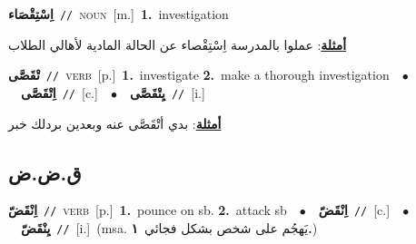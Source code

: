 \documentclass[10pt,a4paper,twoside]{article} %
\begin{document}
\begin{multicols}{2}
{\setlength\topsep{0pt}\textbf{\foreignlanguage{arabic}{اِسْتِقْصَاء}}\ {\color{gray}\texttt{//}\color{black}}\ \textsc{noun}\ [m.]\ \textbf{1.}~investigation\  \begin{flushright}\color{gray}\foreignlanguage{arabic}{\textbf{\underline{\foreignlanguage{arabic}{أمثلة}}}: عملوا بالمدرسة اِسْتِقْصاء عن الحالة المادية لأهالي الطلاب}\end{flushright}\color{black}} \vspace{2mm}

{\setlength\topsep{0pt}\textbf{\foreignlanguage{arabic}{تْقَصَّى}}\ {\color{gray}\texttt{//}\color{black}}\ \textsc{verb}\ [p.]\ \textbf{1.}~investigate  \textbf{2.}~make a thorough investigation\ \ $\bullet$\ \ \setlength\topsep{0pt}\textbf{\foreignlanguage{arabic}{اِتْقَصَّى}}\ {\color{gray}\texttt{//}\color{black}}\ [c.]\ \ $\bullet$\ \ \setlength\topsep{0pt}\textbf{\foreignlanguage{arabic}{يِتْقَصَّى}}\ {\color{gray}\texttt{//}\color{black}}\ [i.]\  \begin{flushright}\color{gray}\foreignlanguage{arabic}{\textbf{\underline{\foreignlanguage{arabic}{أمثلة}}}: بدي أتْقَصَّى عنه وبعدين بردلك خبر}\end{flushright}\color{black}} \vspace{2mm}

\vspace{-3mm}
\subsection*{\color{blue}\foreignlanguage{arabic}{ق.ض.ض}\color{blue}{}} 

{\setlength\topsep{0pt}\textbf{\foreignlanguage{arabic}{اِنْقَضّ}}\ {\color{gray}\texttt{//}\color{black}}\ \textsc{verb}\ [p.]\ \textbf{1.}~pounce on sb.  \textbf{2.}~attack sb\ \ $\bullet$\ \ \setlength\topsep{0pt}\textbf{\foreignlanguage{arabic}{اِنْقَضّ}}\ {\color{gray}\texttt{//}\color{black}}\ [c.]\ \ $\bullet$\ \ \setlength\topsep{0pt}\textbf{\foreignlanguage{arabic}{يِنْقَضّ}}\ {\color{gray}\texttt{//}\color{black}}\ [i.]\ \color{gray}(msa. \foreignlanguage{arabic}{يَهجُم على شخص بشكل فجائي}~\foreignlanguage{arabic}{\textbf{١.}})\color{black}\ } \vspace{2mm}


\end{multicols}
\end{document}
